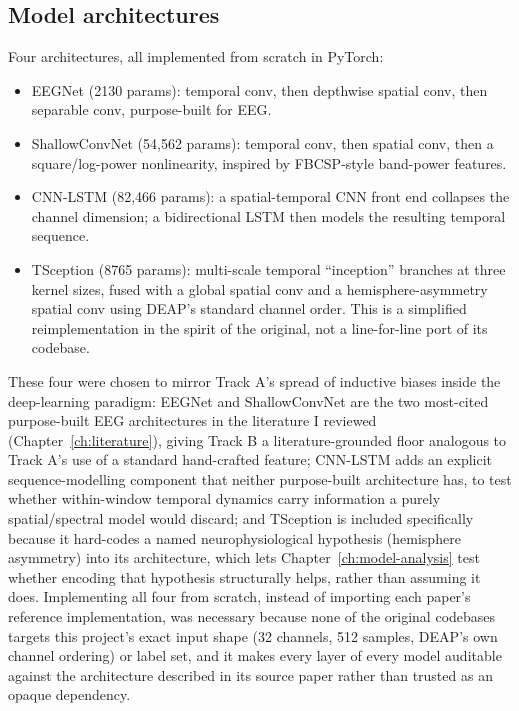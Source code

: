 \documentclass[11pt]{report}
\begin{document}
\subsection{Model architectures}
Four architectures, all implemented from scratch in PyTorch:
\begin{itemize}
  \item EEGNet \citep{lawhern2018eegnet} (2130 params): temporal conv, then
        depthwise spatial conv, then separable conv, purpose-built for EEG.
  \item ShallowConvNet \citep{schirrmeister2017shallow} (54{,}562 params):
        temporal conv, then spatial conv, then a square/log-power
        nonlinearity, inspired by FBCSP-style band-power features.
  \item CNN-LSTM (82{,}466 params): a spatial-temporal CNN front end
        collapses the channel dimension; a bidirectional LSTM then models
        the resulting temporal sequence.
  \item TSception \citep{ding2022tsception} (8765 params): multi-scale temporal
        ``inception'' branches at three kernel sizes, fused with a global
        spatial conv and a hemisphere-asymmetry spatial conv using DEAP's
        standard channel order. This is a simplified reimplementation in the
        spirit of the original, not a line-for-line port of its codebase.
\end{itemize}
These four were chosen to mirror Track A's spread of inductive biases inside
the deep-learning paradigm: EEGNet and ShallowConvNet are the two most-cited
purpose-built EEG architectures in the literature I reviewed
(Chapter~\ref{ch:literature}), giving Track B a literature-grounded floor
analogous to Track A's use of a standard hand-crafted feature; CNN-LSTM adds
an explicit sequence-modelling component that neither purpose-built
architecture has, to test whether within-window temporal dynamics carry
information a purely spatial/spectral model would discard; and TSception is
included specifically because it hard-codes a named neurophysiological
hypothesis (hemisphere asymmetry) into its architecture, which lets
Chapter~\ref{ch:model-analysis} test whether encoding that hypothesis
structurally helps, rather than assuming it does. Implementing all four from
scratch, instead of importing each paper's reference implementation, was
necessary because none of the original codebases targets this project's
exact input shape (32 channels, 512 samples, DEAP's own channel ordering) or
label set, and it makes every layer of every model auditable against the
architecture described in its source paper rather than trusted as an opaque
dependency.
\end{document}

